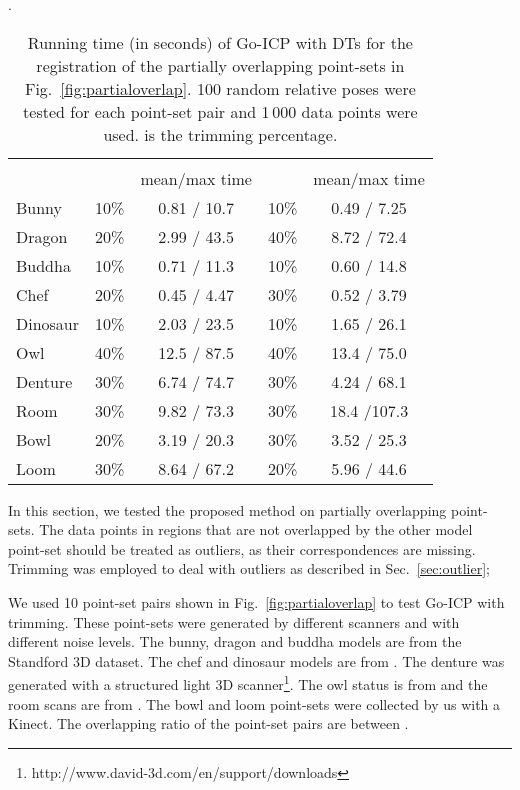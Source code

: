 \documentclass[10pt,journal,cspaper,compsoc]{IEEEtran}
\begin{document}
\begin{table}[!t]
    \centering
    \caption{Running time (in seconds) of Go-ICP with DTs for the registration of the partially overlapping point-sets in Fig.~\ref{fig:partialoverlap}. 100 random relative poses were tested for each point-set pair and 1\,000 data points were used.  is the trimming percentage.}.
    \label{tab:time_partial}
    \begin{tabular}{|l|c|c|c|c|}
        \hline
         & \multicolumn{2}{|c|}{} &  \multicolumn{2}{|c|}{} \\
        \cline{2-5}
         &   & \!\!mean/max time\!\! &   & \!\!mean/max time\!\! \\
        \hline
        Bunny & 10\% & 0.81 / 10.7 & 10\% & 0.49 / 7.25 \\
        \hline
        Dragon  & 20\% & 2.99 / 43.5 &  40\% & 8.72 / 72.4 \\
        \hline
        Buddha  & 10\% & 0.71 / 11.3 & 10\% & 0.60 / 14.8 \\
        \hline
        Chef  & 20\% & 0.45 / 4.47 & 30\% & 0.52 / 3.79 \\
        \hline
        Dinosaur & 10\% & 2.03 / 23.5 & 10\% & 1.65 / 26.1 \\
        \hline
        Owl & 40\% & 12.5 / 87.5 & 40\% & 13.4 / 75.0 \\
        \hline
        Denture & 30\% & 6.74 / 74.7 & 30\% & 4.24 / 68.1 \\
        \hline
        Room & 30\% & 9.82 / 73.3 & 30\% & 18.4 /107.3 \\
        \hline
        Bowl & 20\% & 3.19 / 20.3 & 30\% & 3.52 / 25.3 \\
        \hline
        Loom & 30\% & 8.64 / 67.2 & 20\% & 5.96 / 44.6 \\
        \hline
    \end{tabular}
\vspace{-0pt}
\end{table}

In this section, we tested the proposed method on partially overlapping point-sets. The data points in regions that are not overlapped by the other model point-set should be treated as outliers, as their correspondences are missing. Trimming was employed to deal with outliers as described in Sec.~\ref{sec:outlier};

We used 10 point-set pairs shown in Fig.~\ref{fig:partialoverlap} to test Go-ICP with trimming. These point-sets were generated by different scanners and with different noise levels. The bunny, dragon and buddha models are from the Standford 3D dataset. The chef and dinosaur models are from \cite{mian2006three}. The denture was generated with a structured light 3D scanner\footnote{http://www.david-3d.com/en/support/downloads}. The owl status is from \cite{bouaziz2013sparse} and the room scans are from \cite{shotton2013scene}. The bowl and loom point-sets were collected by us with a Kinect. The overlapping ratio of the point-set pairs are between .
\end{document}
